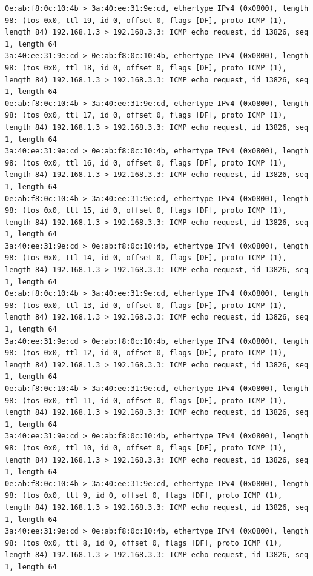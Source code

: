 \documentclass[a4paper,12pt]{article}
\begin{document}
\begin{Verbatim}
0e:ab:f8:0c:10:4b > 3a:40:ee:31:9e:cd, ethertype IPv4 (0x0800), length 98: (tos 0x0, ttl 19, id 0, offset 0, flags [DF], proto ICMP (1), length 84) 192.168.1.3 > 192.168.3.3: ICMP echo request, id 13826, seq 1, length 64
3a:40:ee:31:9e:cd > 0e:ab:f8:0c:10:4b, ethertype IPv4 (0x0800), length 98: (tos 0x0, ttl 18, id 0, offset 0, flags [DF], proto ICMP (1), length 84) 192.168.1.3 > 192.168.3.3: ICMP echo request, id 13826, seq 1, length 64
0e:ab:f8:0c:10:4b > 3a:40:ee:31:9e:cd, ethertype IPv4 (0x0800), length 98: (tos 0x0, ttl 17, id 0, offset 0, flags [DF], proto ICMP (1), length 84) 192.168.1.3 > 192.168.3.3: ICMP echo request, id 13826, seq 1, length 64
3a:40:ee:31:9e:cd > 0e:ab:f8:0c:10:4b, ethertype IPv4 (0x0800), length 98: (tos 0x0, ttl 16, id 0, offset 0, flags [DF], proto ICMP (1), length 84) 192.168.1.3 > 192.168.3.3: ICMP echo request, id 13826, seq 1, length 64
0e:ab:f8:0c:10:4b > 3a:40:ee:31:9e:cd, ethertype IPv4 (0x0800), length 98: (tos 0x0, ttl 15, id 0, offset 0, flags [DF], proto ICMP (1), length 84) 192.168.1.3 > 192.168.3.3: ICMP echo request, id 13826, seq 1, length 64
3a:40:ee:31:9e:cd > 0e:ab:f8:0c:10:4b, ethertype IPv4 (0x0800), length 98: (tos 0x0, ttl 14, id 0, offset 0, flags [DF], proto ICMP (1), length 84) 192.168.1.3 > 192.168.3.3: ICMP echo request, id 13826, seq 1, length 64
0e:ab:f8:0c:10:4b > 3a:40:ee:31:9e:cd, ethertype IPv4 (0x0800), length 98: (tos 0x0, ttl 13, id 0, offset 0, flags [DF], proto ICMP (1), length 84) 192.168.1.3 > 192.168.3.3: ICMP echo request, id 13826, seq 1, length 64
3a:40:ee:31:9e:cd > 0e:ab:f8:0c:10:4b, ethertype IPv4 (0x0800), length 98: (tos 0x0, ttl 12, id 0, offset 0, flags [DF], proto ICMP (1), length 84) 192.168.1.3 > 192.168.3.3: ICMP echo request, id 13826, seq 1, length 64
0e:ab:f8:0c:10:4b > 3a:40:ee:31:9e:cd, ethertype IPv4 (0x0800), length 98: (tos 0x0, ttl 11, id 0, offset 0, flags [DF], proto ICMP (1), length 84) 192.168.1.3 > 192.168.3.3: ICMP echo request, id 13826, seq 1, length 64
3a:40:ee:31:9e:cd > 0e:ab:f8:0c:10:4b, ethertype IPv4 (0x0800), length 98: (tos 0x0, ttl 10, id 0, offset 0, flags [DF], proto ICMP (1), length 84) 192.168.1.3 > 192.168.3.3: ICMP echo request, id 13826, seq 1, length 64
0e:ab:f8:0c:10:4b > 3a:40:ee:31:9e:cd, ethertype IPv4 (0x0800), length 98: (tos 0x0, ttl 9, id 0, offset 0, flags [DF], proto ICMP (1), length 84) 192.168.1.3 > 192.168.3.3: ICMP echo request, id 13826, seq 1, length 64
3a:40:ee:31:9e:cd > 0e:ab:f8:0c:10:4b, ethertype IPv4 (0x0800), length 98: (tos 0x0, ttl 8, id 0, offset 0, flags [DF], proto ICMP (1), length 84) 192.168.1.3 > 192.168.3.3: ICMP echo request, id 13826, seq 1, length 64

\end{Verbatim}
\end{document}
